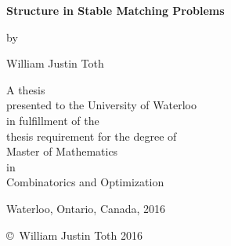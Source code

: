 \pagestyle{empty}

\begin{titlepage}
        \begin{center}
        \vspace*{1.0cm}

        \Huge
        {\bf Structure in Stable Matching Problems }

        \vspace*{1.0cm}

        \normalsize
        by \\

        \vspace*{1.0cm}

        \Large
        William Justin Toth \\

        \vspace*{3.0cm}

        \normalsize
        A thesis \\
        presented to the University of Waterloo \\ 
        in fulfillment of the \\
        thesis requirement for the degree of \\
        Master of Mathematics \\
        in \\
        Combinatorics and Optimization \\

        \vspace*{2.0cm}

        Waterloo, Ontario, Canada, 2016 \\

        \vspace*{1.0cm}

        \copyright\ William Justin Toth 2016 \\
        \end{center}
\end{titlepage}

\pagestyle{plain}
\setcounter{page}{2}

